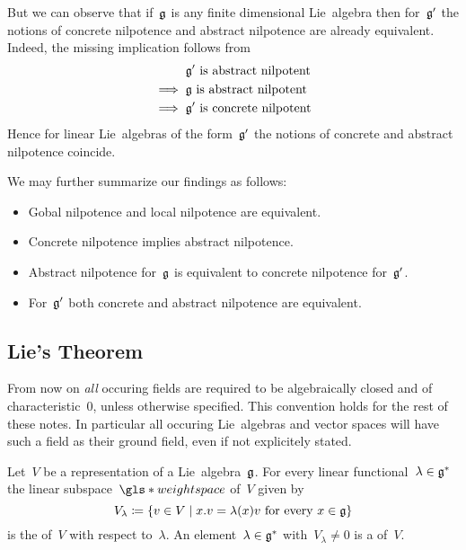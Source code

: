 \begin{remark}
  But we can observe that if~$\mathfrak{g}$ is any finite dimensional Lie~algebra then for~$\mathfrak{g}'$ the notions of concrete nilpotence and abstract nilpotence are already equivalent.
  Indeed, the missing implication follows from
  \begin{align*}
    {}&
    \text{$\mathfrak{g}'$ is abstract nilpotent}
    \\
    \implies{}&
    \text{$\mathfrak{g}$ is abstract nilpotent}
    \\
    \implies{}&
    \text{$\mathfrak{g}'$ is concrete nilpotent}
  \end{align*}
  Hence for linear Lie~algebras of the form~$\mathfrak{g}'$ the notions of concrete and abstract nilpotence coincide.
  
  We may further summarize our findings as follows:
  \begin{itemize}
    \item
      Gobal nilpotence and local nilpotence are equivalent.
    \item
      Concrete nilpotence implies abstract nilpotence.
    \item
      Abstract nilpotence for~$\mathfrak{g}$ is equivalent to concrete nilpotence for~$\mathfrak{g}'$.
    \item
      For~$\mathfrak{g}'$ both concrete and abstract nilpotence are equivalent.
  \end{itemize}
\end{remark}





\subsection{Lie’s Theorem}


\begin{convention}
  From now on \emph{all} occuring fields are required to be algebraically closed and of characteristic~$0$, unless otherwise specified.
  This convention holds for the rest of these notes.
  In particular all occuring Lie~algebras and vector spaces will have such a field as their ground field, even if not explicitely stated.
\end{convention}


\begin{definition}
  Let~$V$ be a representation of a Lie~algebra~$\mathfrak{g}$.
  For every linear functional~$\lambda \in \mathfrak{g}^*$ the linear subspace~$\gls*{weight space}$ of~$V$ given by
  \[
    V_\lambda
    \defined
    \{
      v \in V
    \suchthat
      \text{$x.v = \lambda(x) v$ for every~$x \in \glie$}
    \}
  \]
  is the  of~$V$ with respect to~$\lambda$.
  An element~$\lambda \in \mathfrak{g}^*$ with~$V_\lambda \neq 0$ is a  of~$V$.
\end{definition}


